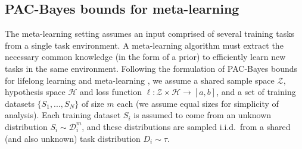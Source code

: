\documentclass{article} %
\theoremstyle{definition}
\begin{document}
\subsection{PAC-Bayes bounds for meta-learning} \label{sec:meta}

The meta-learning setting assumes an input comprised of several training tasks from a single task environment. A meta-learning algorithm must extract the necessary common knowledge (in the form of a prior) to efficiently learn new tasks in the same environment. Following the formulation of PAC-Bayes bounds for lifelong learning \citep{Pentina2014} and meta-learning \citep{Amit2018}, we assume a shared sample space $\mathcal{Z}$, hypothesis space $\mathcal{H}$ and loss function $\ell:\mathcal{Z}\times \mathcal{H}\rightarrow [a,b]$, and a set of training datasets $\{S_1,...,S_N\}$ of size $m$ each (we assume equal sizes for simplicity of analysis). Each training dataset $S_i$ is assumed to come from an unknown distribution $S_i\sim \mathcal{D}^m_i$, and these distributions are sampled i.i.d.\ from a shared (and also unknown) task distribution $D_i\sim \tau$.
\end{document}
